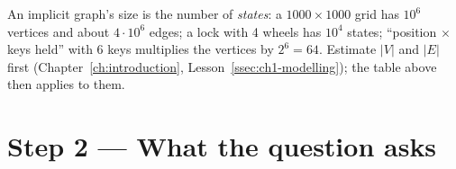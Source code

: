 \begin{insightbox}
An implicit graph's size is the number of \emph{states}: a $1000\times1000$ grid has $10^6$ vertices and about $4\cdot10^6$ edges; a lock with 4 wheels has $10^4$ states; ``position $\times$ keys held'' with 6 keys multiplies the vertices by $2^6 = 64$. Estimate $|V|$ and $|E|$ first (Chapter~\ref{ch:introduction}, Lesson~\ref{ssec:ch1-modelling}); the table above then applies to them.
\end{insightbox}

\clearpage
\section*{Step 2 --- What the question asks}

\begingroup\small\renewcommand{\arraystretch}{1.3}
